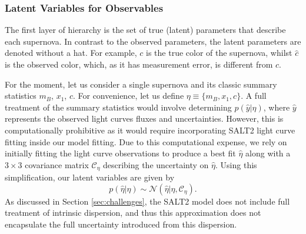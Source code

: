 \documentclass[twocolumn,trackchanges,tighten]{aastex62}
\begin{document}
\subsubsection{Latent Variables for Observables}

The first layer of hierarchy is the set of true (latent) parameters that describe each supernova. In contrast to the observed parameters, the latent parameters are denoted without a hat. For example, $c$ is the true color of the supernova, whilst $\hat{c}$ is the observed color, which, as it has measurement error, is different from $c$.

For the moment, let us consider a single supernova and its classic summary statistics $m_B$, $x_1$, $c$. For convenience, let us define $\eta \equiv \lbrace m_B, x_1, c \rbrace$. A full treatment of the summary statistics would involve determining $p(\hat{y}|\eta)$, where $\hat{y}$ represents the observed light curves fluxes and uncertainties. However, this is computationally prohibitive  as it would require incorporating SALT2 light curve fitting inside our model fitting. Due to this computational expense, we rely on initially fitting the light curve observations to produce a best fit $\hat{\eta}$ along with a $3\times3$ covariance matrix $\mathcal{C_\eta}$ describing the uncertainty on $\hat{\eta}$. Using this simplification, our latent variables are given by
\begin{equation}
p(\hat{\eta}|\eta) \sim \mathcal{N}(\hat{\eta} | \eta, \mathcal{C_\eta}). \label{eq:pop}
\end{equation}
As discussed in Section \ref{sec:challenges},  the SALT2 model does not include full treatment of intrinsic dispersion, and thus this approximation does not encapsulate the full uncertainty introduced from this dispersion.
\end{document}
